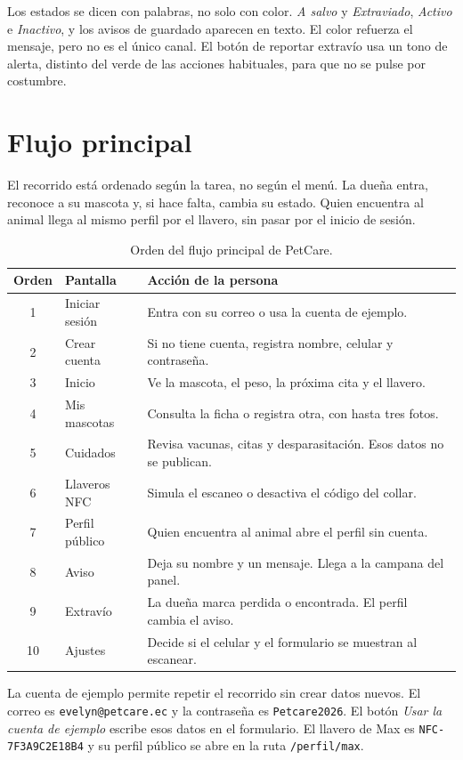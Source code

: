 \documentclass[12pt,a4paper]{article}
\begin{document}
Los estados se dicen con palabras, no solo con color. \emph{A salvo} y \emph{Extraviado}, \emph{Activo} e \emph{Inactivo}, y los avisos de guardado aparecen en texto. El color refuerza el mensaje, pero no es el único canal. El botón de reportar extravío usa un tono de alerta, distinto del verde de las acciones habituales, para que no se pulse por costumbre.

\section{Flujo principal}

El recorrido está ordenado según la tarea, no según el menú. La dueña entra, reconoce a su mascota y, si hace falta, cambia su estado. Quien encuentra al animal llega al mismo perfil por el llavero, sin pasar por el inicio de sesión.

\begin{table}[ht]
\centering
\small
\begin{tabularx}{\textwidth}{c l X}
\toprule
\textbf{Orden} & \textbf{Pantalla} & \textbf{Acción de la persona} \\
\midrule
1 & Iniciar sesión & Entra con su correo o usa la cuenta de ejemplo. \\
2 & Crear cuenta & Si no tiene cuenta, registra nombre, celular y contraseña. \\
3 & Inicio & Ve la mascota, el peso, la próxima cita y el llavero. \\
4 & Mis mascotas & Consulta la ficha o registra otra, con hasta tres fotos. \\
5 & Cuidados & Revisa vacunas, citas y desparasitación. Esos datos no se publican. \\
6 & Llaveros NFC & Simula el escaneo o desactiva el código del collar. \\
7 & Perfil público & Quien encuentra al animal abre el perfil sin cuenta. \\
8 & Aviso & Deja su nombre y un mensaje. Llega a la campana del panel. \\
9 & Extravío & La dueña marca perdida o encontrada. El perfil cambia el aviso. \\
10 & Ajustes & Decide si el celular y el formulario se muestran al escanear. \\
\bottomrule
\end{tabularx}
\caption{Orden del flujo principal de PetCare.}
\end{table}

La cuenta de ejemplo permite repetir el recorrido sin crear datos nuevos. El correo es \texttt{evelyn@petcare.ec} y la contraseña es \texttt{Petcare2026}. El botón \emph{Usar la cuenta de ejemplo} escribe esos datos en el formulario. El llavero de Max es \texttt{NFC-7F3A9C2E18B4} y su perfil público se abre en la ruta \texttt{/perfil/max}.
\end{document}
